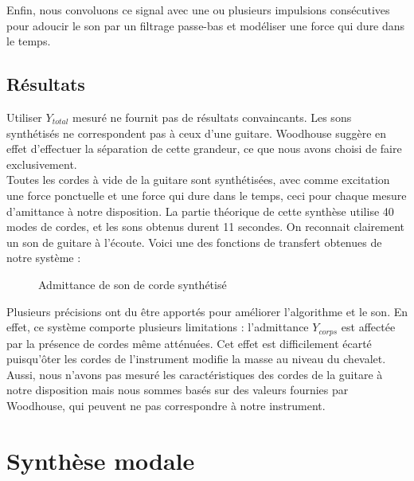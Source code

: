 Enfin, nous convoluons ce signal avec une ou plusieurs impulsions consécutives pour adoucir le son par un filtrage passe-bas et modéliser une force qui dure dans le temps.

\subsection{Résultats}
%

Utiliser $Y_{total}$ mesuré ne fournit pas de résultats convaincants. Les sons synthétisés ne correspondent pas à ceux d'une guitare. Woodhouse suggère en effet d'effectuer la séparation de cette grandeur, ce que nous avons choisi de faire exclusivement.\\

Toutes les cordes à vide de la guitare sont synthétisées, avec comme excitation une force ponctuelle et une force qui dure dans le temps, ceci pour chaque mesure d'amittance à notre disposition. La partie théorique de cette synthèse utilise 40 modes de cordes, et les sons obtenus durent 11 secondes. On reconnait clairement un son de guitare à l'écoute. Voici une des fonctions de transfert obtenues de notre système :

\begin{figure}[h]
\centering
\caption{Admittance de son de corde synthétisé}
\label{fig:frf_fig_1}
\end{figure}


Plusieurs précisions ont du être apportés pour améliorer l'algorithme et le
son. En effet, ce système comporte plusieurs limitations : l'admittance
$Y_{corps}$ est affectée par la présence de cordes même atténuées. Cet effet est difficilement écarté puisqu'ôter les cordes de l'instrument modifie la masse au niveau du chevalet. Aussi, nous n'avons pas mesuré les caractéristiques des cordes de la guitare à notre disposition mais nous sommes basés sur des valeurs fournies par Woodhouse, qui peuvent ne pas correspondre à notre instrument.\\


%
%
%
%


\section{Synthèse modale}

